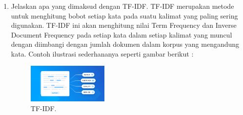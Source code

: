 \begin{enumerate}
	\item Jelaskan apa yang dimaksud dengan TF-IDF.
	\hfill\break
	TF-IDF merupakan metode untuk menghitung bobot setiap kata pada suatu kalimat yang paling sering digunakan. TF-IDF ini akan menghitung nilai Term Frequency dan Inverse Document Frequency pada setiap kata dalam setiap kalimat yang muncul dengan diimbangi dengan jumlah dokumen dalam korpus yang mengandung kata. Contoh ilustrasi sederhananya seperti gambar berikut : 

	\begin{figure}[H]
	\centering
		\includegraphics[width=4cm]{figures/1174021/tugas4/materi/5.PNG}
		\caption{TF-IDF.}
	\end{figure}
\end{enumerate}


